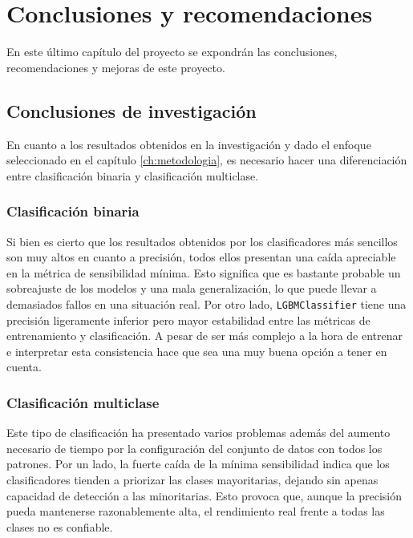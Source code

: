 \chapter{Conclusiones y recomendaciones}
\label{ch:conclusiones}

En este último capítulo del proyecto se expondrán las conclusiones, recomendaciones y mejoras de este proyecto.

\section{Conclusiones de investigación}
\label{sec:conc_investigacion}

En cuanto a los resultados obtenidos en la investigación y dado el enfoque seleccionado en el capítulo \ref{ch:metodologia}, es necesario hacer una diferenciación entre clasificación binaria y clasificación multiclase.

\subsection{Clasificación binaria}
\label{subsec:conc_bin}

Si bien es cierto que los resultados obtenidos por los clasificadores más sencillos son muy altos en cuanto a precisión, todos ellos presentan una caída apreciable en la métrica de sensibilidad mínima. Esto significa que es bastante probable un sobreajuste de los modelos y una mala generalización, lo que puede llevar a demasiados fallos en una situación real. Por otro lado, \texttt{LGBMClassifier} tiene una precisión ligeramente inferior pero mayor estabilidad entre las métricas de entrenamiento y clasificación. A pesar de ser más complejo a la hora de entrenar e interpretar esta consistencia hace que sea una muy buena opción a tener en cuenta.

\newpage
\subsection{Clasificación multiclase}
\label{subsec:conc_multi}

Este tipo de clasificación ha presentado varios problemas además del aumento necesario de tiempo por la configuración del conjunto de datos con todos los patrones. Por un lado, la fuerte caída de la mínima sensibilidad indica que los clasificadores tienden a priorizar las clases mayoritarias, dejando sin apenas capacidad de detección a las minoritarias. Esto provoca que, aunque la precisión pueda mantenerse razonablemente alta, el rendimiento real frente a todas las clases no es confiable.

